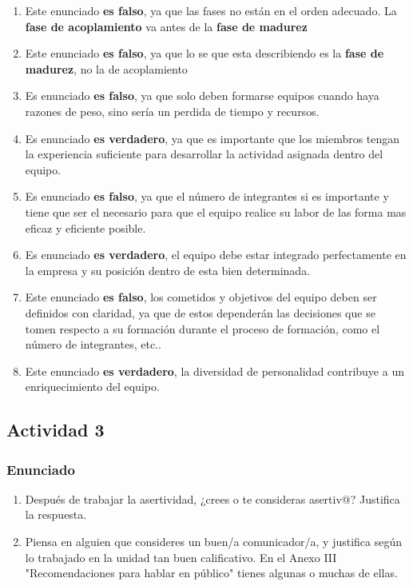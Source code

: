 \begin{enumerate}[label=\alph*.]
    \item Este enunciado \textbf{es falso}, ya que las fases no están en el orden adecuado. La \textbf{fase de acoplamiento} va antes de la \textbf{fase de madurez}
    \item Este enunciado \textbf{es falso}, ya que lo se que esta describiendo es la \textbf{fase de madurez}, no la de acoplamiento
    \item Es enunciado \textbf{es falso}, ya que solo deben formarse equipos cuando haya razones de peso, sino sería un perdida de tiempo y recursos.
    \item Es enunciado \textbf{es verdadero}, ya que es importante que los miembros tengan la experiencia suficiente para desarrollar la actividad asignada dentro del equipo.
    \item Es enunciado \textbf{es falso}, ya que el número de integrantes si es importante y tiene que ser el necesario para que el equipo realice su labor de las forma mas eficaz y eficiente posible.
    \item Es enunciado \textbf{es verdadero}, el equipo debe estar integrado perfectamente en la empresa y su posición dentro de esta bien determinada.
    \item Este enunciado \textbf{es falso}, los cometidos y objetivos del equipo deben ser definidos con claridad, ya que de estos dependerán las decisiones que se tomen respecto a su formación durante el proceso de formación, como el número de integrantes, etc..
    \item Este enunciado \textbf{es verdadero}, la diversidad de personalidad contribuye a un enriquecimiento del equipo.
\end{enumerate}

\subsection{Actividad 3}

\subsubsection{Enunciado}
\begin{enumerate}
    \item Después de trabajar la asertividad, ¿crees o te consideras asertiv@? Justifica la respuesta.
    \item Piensa en alguien que consideres un buen/a comunicador/a, y justifica según lo trabajado en la unidad tan buen calificativo. En el Anexo III "Recomendaciones para hablar en público" tienes algunas o muchas de ellas.
\end{enumerate}

